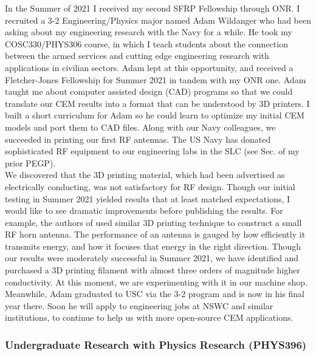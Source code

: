 \documentclass[../../../main.tex]{subfiles}
\begin{document}
In the Summer of 2021 I received my second SFRP Fellowship through ONR.  I recruited a 3-2 Engineering/Physics major named Adam Wildanger who had been asking about my engineering research with the Navy for a while.  He took my COSC330/PHYS306 course, in which I teach students about the connection between the armed services and cutting edge engineering research with applications in civilian sectors.  Adam lept at this opportunity, and received a Fletcher-Jones Fellowship for Summer 2021 in tandem with my ONR one.  Adam taught me about computer assisted design (CAD) programs so that we could translate our CEM results into a format that can be understood by 3D printers.  I built a short curriculum for Adam so he could learn to optimize my initial CEM models and port them to CAD files.  Along with our Navy colleagues, we succeeded in printing our first RF antennas.  The US Navy has donated sophisticated RF equipment to our engineering labs in the SLC (see Sec. of my prior PEGP).
\\
\vspace{0.25cm}
We discovered that the 3D printing material, which had been advertised as electrically conducting, was not satisfactory for RF design.  Though our initial testing in Summer 2021 yielded results that at least matched expectations, I would like to see dramatic improvements before publishing the results.  For example, the authors of \cite{10.1109/access.2019.2932912} used similar 3D printing technique to construct a small RF horn antenna.  The performance of an antenna is gauged by how efficiently it transmits energy, and how it focuses that energy in the right direction.  Though our results were moderately successful in Summer 2021, we have identified and purchased a 3D printing filament with almost three orders of magnitude higher conductivity.  At this moment, we are experimenting with it in our machine shop.  Meanwhile, Adam graduated to USC via the 3-2 program and is now in his final year there.  Soon he will apply to engineering jobs at NSWC and similar institutions, to continue to help us with more open-source CEM applications.

\subsubsection{Undergraduate Research with Physics Research (PHYS396)}
\end{document}
